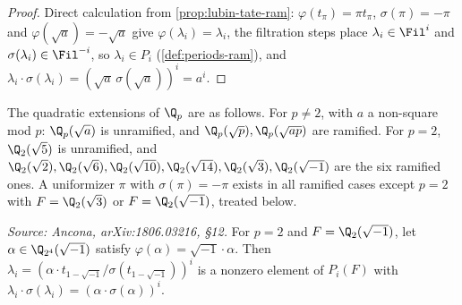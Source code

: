 \begin{proof}
  Direct calculation from \cref{prop:lubin-tate-ram}: \(\varphi(t_\pi) = \pi
  t_\pi\), \(\sigma(\pi) = -\pi\) and \(\varphi(\sqrt{a}) = -\sqrt{a}\) give
  \(\varphi(\lambda_i) = \lambda_i\), the filtration steps place
  \(\lambda_i \in \Fil^i\) and \(\sigma(\lambda_i) \in \Fil^{-i}\), so
  \(\lambda_i \in P_i\) (\cref{def:periods-ram}), and \(\lambda_i \cdot
  \sigma(\lambda_i) = (\sqrt{a}\,\sigma(\sqrt{a}))^i = a^i\).
\end{proof}

\begin{remark}
  The quadratic extensions of \(\Q_p\) are as follows. For \(p \neq 2\), with
  \(a\) a non-square mod \(p\): \(\Q_p(\sqrt{a})\) is unramified, and
  \(\Q_p(\sqrt{p}), \Q_p(\sqrt{ap})\) are ramified. For \(p = 2\),
  \(\Q_2(\sqrt 5)\) is unramified, and \(\Q_2(\sqrt 2), \Q_2(\sqrt 6),
  \Q_2(\sqrt{10}), \Q_2(\sqrt{14}), \Q_2(\sqrt 3), \Q_2(\sqrt{-1})\) are the six
  ramified ones. A uniformizer \(\pi\) with \(\sigma(\pi) = -\pi\) exists in all
  ramified cases except \(p = 2\) with \(F = \Q_2(\sqrt 3)\) or
  \(F = \Q_2(\sqrt{-1})\), treated below.
\end{remark}

\begin{corollary}[Explicit period, \(F = \Q_2(\sqrt{-1})\)]
  \label{cor:period-wild}
  \textit{Source: Ancona, arXiv:1806.03216, \S12.}
  For \(p = 2\) and \(F = \Q_2(\sqrt{-1})\), let \(\alpha \in
  \Q_{2^4}(\sqrt{-1})\) satisfy \(\varphi(\alpha) = \sqrt{-1} \cdot \alpha\).
  Then \(\lambda_i = (\alpha \cdot t_{1-\sqrt{-1}}/\sigma(t_{1-\sqrt{-1}}))^i\)
  is a nonzero element of \(P_i(F)\) with
  \(\lambda_i \cdot \sigma(\lambda_i) = (\alpha \cdot \sigma(\alpha))^i\).
\end{corollary}

